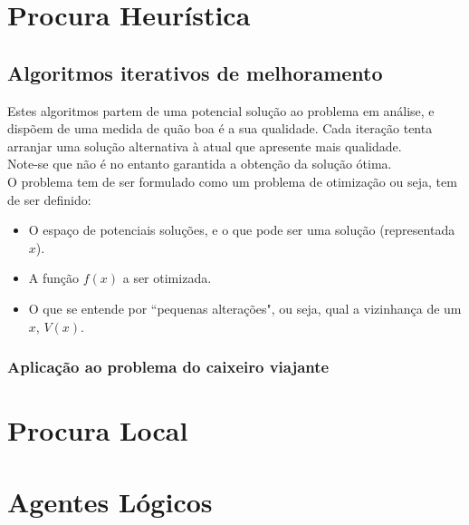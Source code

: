\documentclass[]{report}
\begin{document}
\chapter{Procura Heurística}
\section{Algoritmos iterativos de melhoramento}
Estes algoritmos partem de uma potencial solução ao problema em análise, e dispõem de uma medida de quão boa é a sua qualidade. Cada iteração tenta arranjar uma solução alternativa à atual que apresente mais qualidade.\\
Note-se que não é no entanto garantida a obtenção da solução ótima.\\[5mm]
O problema tem de ser formulado como um problema de otimização ou seja, tem de ser definido:
\begin{itemize}
\item O espaço de potenciais soluções, e o que pode ser uma solução (representada $x$).
\item A função $f(x)$ a ser otimizada.
\item O que se entende por ``pequenas alterações", ou seja, qual a vizinhança de um $x$, $V(x)$.
\end{itemize}
\subsection{Aplicação ao problema do caixeiro viajante}
\chapter{Procura Local}
\chapter{Agentes Lógicos}
\end{document}
